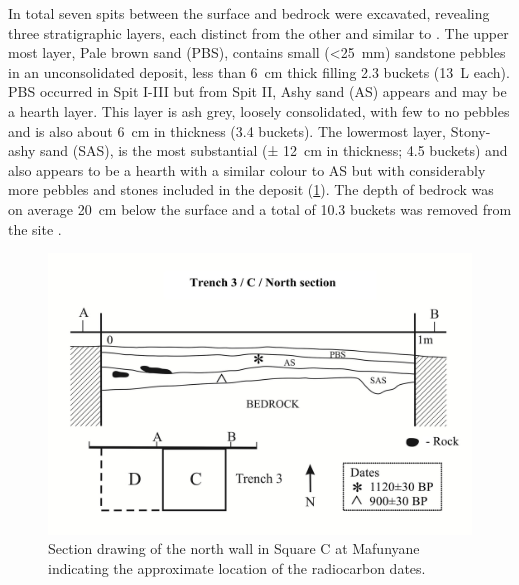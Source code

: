 In total seven spits between the surface and bedrock were excavated, revealing three stratigraphic layers, each distinct from the other and similar to \textcite{Walker_1994}. 
The upper most layer, Pale brown sand (PBS), contains small (<\SI{25}{\milli\meter}) sandstone pebbles in an unconsolidated deposit,
 less than \SI{6}{\centi\meter} thick filling \num{2,3} buckets (\SI{13}{\liter} each). 
PBS occurred in Spit I-III but from Spit II, Ashy sand (AS) appears and may be a hearth layer. 
This layer is ash grey, loosely consolidated, with few to no pebbles and is also about \SI{6}{\centi\meter} in thickness (\num{3.4} buckets). 
The lowermost layer, Stony-ashy sand (SAS), is the most substantial (± \SI{12}{\centi\meter} in thickness; \num{4.5} buckets) and also appears to be a hearth with a similar colour to AS but with considerably more pebbles and stones included in the deposit (\cref{fig:Forssman-Figure03}). The depth of bedrock was on average \SI{20}{\centi\meter} below the surface and a total of \num{10.3} buckets was removed from the site \parencite[for more details see][95]{Forssman_2014a}. 

	\begin{figure}
		\includegraphics[width=\linewidth]{figures/Forssman-Figure03}
		\caption{Section drawing of the north wall in Square C at Mafunyane indicating the approximate location of the radiocarbon dates.}
		\centering
		\label{fig:Forssman-Figure03}
	\end{figure}


